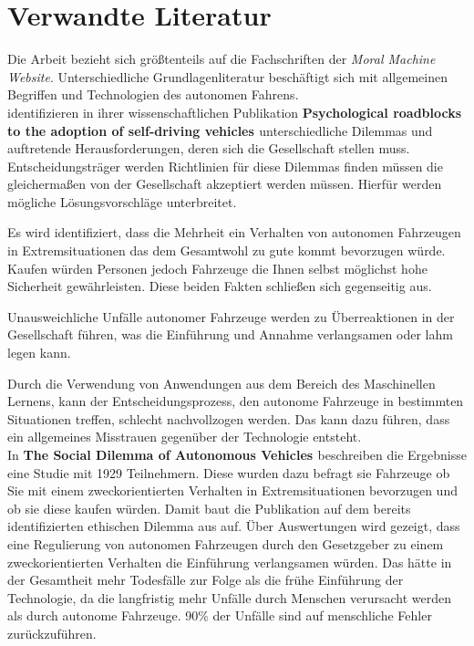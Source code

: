 \section{Verwandte Literatur}
\label{sec:verwandte-literatur}

Die Arbeit bezieht sich größtenteils auf die Fachschriften der \textit{Moral Machine Website}. Unterschiedliche Grundlagenliteratur beschäftigt sich mit allgemeinen Begriffen und Technologien des autonomen Fahrens.\\

\citeauthor{roadblocks} identifizieren in ihrer wissenschaftlichen Publikation \textbf{Psychological roadblocks to the adoption of self-driving vehicles \cite{roadblocks}} unterschiedliche Dilemmas und auftretende Herausforderungen, deren sich die Gesellschaft stellen muss. Entscheidungsträger werden Richtlinien für diese Dilemmas finden müssen die gleichermaßen von der Gesellschaft akzeptiert werden müssen. Hierfür werden mögliche Lösungsvorschläge unterbreitet. 

Es wird identifiziert, dass die Mehrheit ein Verhalten von autonomen Fahrzeugen in Extremsituationen das dem Gesamtwohl zu gute kommt bevorzugen würde. Kaufen würden Personen jedoch Fahrzeuge die Ihnen selbst möglichst hohe Sicherheit gewährleisten. Diese beiden Fakten schließen sich gegenseitig aus.

Unausweichliche Unfälle autonomer Fahrzeuge werden zu Überreaktionen in der Gesellschaft führen, was die Einführung und Annahme verlangsamen oder lahm legen kann.

Durch die Verwendung von Anwendungen aus dem Bereich des Maschinellen Lernens, kann der Entscheidungsprozess, den autonome Fahrzeuge in bestimmten Situationen treffen, schlecht nachvollzogen werden. Das kann dazu führen, dass ein allgemeines  Misstrauen gegenüber der Technologie  entsteht.\\

In \textbf{The Social Dilemma of Autonomous Vehicles \cite{socialDilemma}} beschreiben \citeauthor{socialDilemma} die Ergebnisse eine Studie mit 1929 Teilnehmern. Diese wurden dazu befragt sie Fahrzeuge ob Sie mit einem zweckorientierten Verhalten in Extremsituationen bevorzugen und ob sie diese kaufen würden. Damit baut die Publikation auf dem bereits identifizierten ethischen Dilemma aus \cite{roadblocks} auf. Über Auswertungen wird gezeigt, dass eine Regulierung von autonomen Fahrzeugen durch den Gesetzgeber zu einem zweckorientierten Verhalten die Einführung verlangsamen würden. Das hätte in der Gesamtheit mehr Todesfälle zur Folge als die frühe Einführung der Technologie, da die langfristig mehr Unfälle durch Menschen verursacht werden als durch autonome Fahrzeuge. 90\% der Unfälle sind auf menschliche Fehler zurückzuführen.\\

